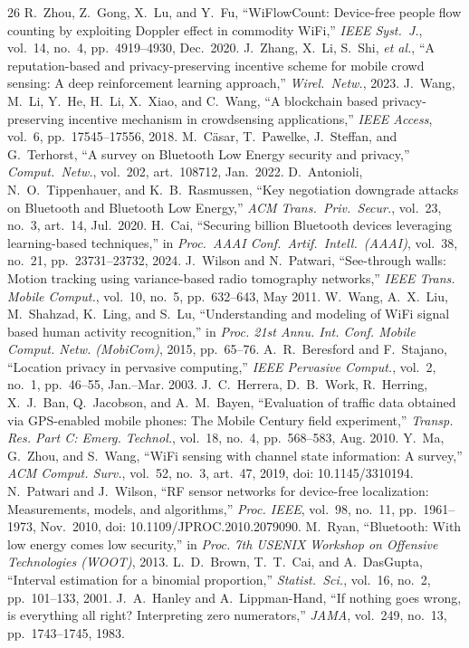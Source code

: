 \documentclass[conference,10pt]{IEEEtran}
\begin{document}
\begin{thebibliography}{26}
 R.~Zhou, Z.~Gong, X.~Lu, and Y.~Fu, ``WiFlowCount: Device-free people flow counting by exploiting Doppler effect in commodity WiFi,'' \emph{IEEE Syst.\ J.}, vol.~14, no.~4, pp.~4919--4930, Dec.~2020.
 J.~Zhang, X.~Li, S.~Shi, \emph{et al.}, ``A reputation-based and privacy-preserving incentive scheme for mobile crowd sensing: A deep reinforcement learning approach,'' \emph{Wirel.\ Netw.}, 2023.
 J.~Wang, M.~Li, Y.~He, H.~Li, X.~Xiao, and C.~Wang, ``A blockchain based privacy-preserving incentive mechanism in crowdsensing applications,'' \emph{IEEE Access}, vol.~6, pp.~17545--17556, 2018.
 M.~C\"asar, T.~Pawelke, J.~Steffan, and G.~Terhorst, ``A survey on Bluetooth Low Energy security and privacy,'' \emph{Comput.\ Netw.}, vol.~202, art.~108712, Jan.~2022.
 D.~Antonioli, N.~O.~Tippenhauer, and K.~B.~Rasmussen, ``Key negotiation downgrade attacks on Bluetooth and Bluetooth Low Energy,'' \emph{ACM Trans.\ Priv.\ Secur.}, vol.~23, no.~3, art.~14, Jul.~2020.
 H.~Cai, ``Securing billion Bluetooth devices leveraging learning-based techniques,'' in \emph{Proc.\ AAAI Conf.\ Artif.\ Intell.\ (AAAI)}, vol.~38, no.~21, pp.~23731--23732, 2024.
 J.~Wilson and N.~Patwari, ``See-through walls: Motion tracking using variance-based radio tomography networks,'' \emph{IEEE Trans. Mobile Comput.}, vol.~10, no.~5, pp.~632--643, May 2011.
 W.~Wang, A.~X.~Liu, M.~Shahzad, K.~Ling, and S.~Lu, ``Understanding and modeling of WiFi signal based human activity recognition,'' in \emph{Proc. 21st Annu. Int. Conf. Mobile Comput. Netw. (MobiCom)}, 2015, pp.~65--76.
 A.~R.~Beresford and F.~Stajano, ``Location privacy in pervasive computing,'' \emph{IEEE Pervasive Comput.}, vol.~2, no.~1, pp.~46--55, Jan.--Mar. 2003.
 J.~C.~Herrera, D.~B.~Work, R.~Herring, X.~J.~Ban, Q.~Jacobson, and A.~M.~Bayen, ``Evaluation of traffic data obtained via GPS-enabled mobile phones: The Mobile Century field experiment,'' \emph{Transp. Res. Part C: Emerg. Technol.}, vol.~18, no.~4, pp.~568--583, Aug. 2010.
 Y.~Ma, G.~Zhou, and S.~Wang, ``WiFi sensing with channel state information: A survey,'' \emph{ACM Comput. Surv.}, vol.~52, no.~3, art.~47, 2019, doi: 10.1145/3310194.
 N.~Patwari and J.~Wilson, ``RF sensor networks for device-free localization: Measurements, models, and algorithms,'' \emph{Proc. IEEE}, vol.~98, no.~11, pp.~1961--1973, Nov.~2010, doi: 10.1109/JPROC.2010.2079090.
 M.~Ryan, ``Bluetooth: With low energy comes low security,'' in \emph{Proc. 7th USENIX Workshop on Offensive Technologies (WOOT)}, 2013.
 L.~D.~Brown, T.~T.~Cai, and A.~DasGupta, ``Interval estimation for a binomial proportion,'' \emph{Statist.\ Sci.}, vol.~16, no.~2, pp.~101--133, 2001.
 J.~A.~Hanley and A.~Lippman-Hand, ``If nothing goes wrong, is everything all right? Interpreting zero numerators,'' \emph{JAMA}, vol.~249, no.~13, pp.~1743--1745, 1983.
\end{thebibliography}
\end{document}
